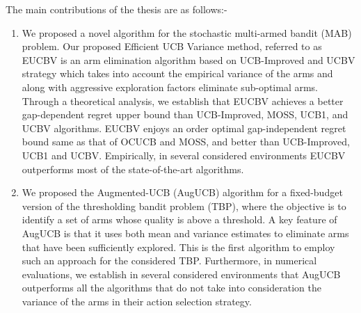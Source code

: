The main contributions of the thesis are as follows:-
\begin{enumerate}
\item We proposed a novel algorithm for the stochastic multi-armed bandit (MAB) problem. Our proposed Efficient UCB Variance method, referred to as EUCBV is an arm elimination algorithm based on UCB-Improved and UCBV strategy which takes into account the empirical variance of the arms and along with aggressive exploration factors eliminate sub-optimal arms. Through a theoretical analysis, we establish that EUCBV achieves a better gap-dependent regret upper bound than UCB-Improved, MOSS, UCB1, and UCBV algorithms. EUCBV enjoys an order optimal gap-independent regret bound same as that of OCUCB and MOSS, and better than UCB-Improved, UCB1 and UCBV. Empirically, in several considered environments EUCBV outperforms most of the state-of-the-art algorithms. 

\item We proposed the Augmented-UCB (AugUCB) algorithm for a fixed-budget version of the thresholding bandit problem (TBP), where the objective is to identify a set of arms whose quality is above a threshold. A key feature of AugUCB is that it uses both mean and variance estimates to eliminate arms that have been sufficiently explored. This is the first algorithm to employ such an approach for the considered TBP. Furthermore, in numerical evaluations, we establish in several considered environments that AugUCB outperforms all the algorithms that do not take into consideration the variance of the arms in their action selection strategy.

\end{enumerate}
 